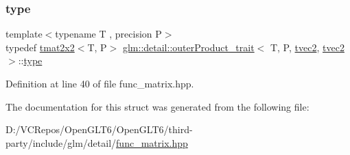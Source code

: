 \subsubsection{\texorpdfstring{type}{type}}
{\footnotesize\ttfamily template$<$typename T , precision P$>$ \\
typedef \mbox{\hyperlink{structglm_1_1tmat2x2}{tmat2x2}}$<$T, P$>$ \mbox{\hyperlink{structglm_1_1detail_1_1outer_product__trait}{glm\+::detail\+::outer\+Product\+\_\+trait}}$<$ T, P, \mbox{\hyperlink{structglm_1_1tvec2}{tvec2}}, \mbox{\hyperlink{structglm_1_1tvec2}{tvec2}} $>$\+::\mbox{\hyperlink{structglm_1_1detail_1_1outer_product__trait_3_01_t_00_01_p_00_01tvec2_00_01tvec2_01_4_a390fb582fa7caa73e53f69181b3b334e}{type}}}



Definition at line 40 of file func\+\_\+matrix.\+hpp.



The documentation for this struct was generated from the following file\+:\begin{DoxyCompactItemize}
\item 
D\+:/\+V\+C\+Repos/\+Open\+G\+L\+T6/\+Open\+G\+L\+T6/third-\/party/include/glm/detail/\mbox{\hyperlink{func__matrix_8hpp}{func\+\_\+matrix.\+hpp}}\end{DoxyCompactItemize}
